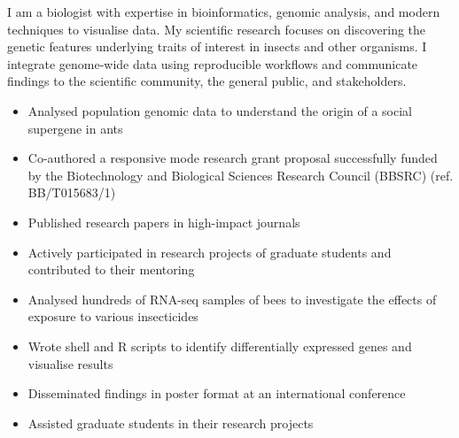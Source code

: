 \documentclass[10pt,a4paper,ragged2e,withhyper]{altacv}
\begin{document}
\begin{paracol}{2}
I am a biologist with expertise in bioinformatics, genomic analysis, and modern 
techniques to visualise data. My scientific research focuses on discovering the 
genetic features underlying traits of interest in insects and other organisms.
I integrate genome-wide data using reproducible workflows and communicate
findings to the scientific community, the general public, and stakeholders.


\begin{itemize}
\item Analysed population genomic data to understand the origin of a social supergene in ants
\item Co-authored a responsive mode research grant proposal successfully funded by 
the Biotechnology and Biological Sciences Research Council (BBSRC) (ref. BB/T015683/1)
\item Published research papers in high-impact journals
\item Actively participated in research projects of graduate students and contributed to their mentoring
\end{itemize}

\divider

\begin{itemize}
\item Analysed hundreds of RNA-seq samples of bees to investigate the effects of exposure to various insecticides
\item Wrote shell and R scripts to identify differentially expressed genes and visualise results
\item Disseminated findings in poster format at an international conference
\item Assisted graduate students in their research projects 
\end{itemize}

\divider


\end{paracol}
\end{document}
